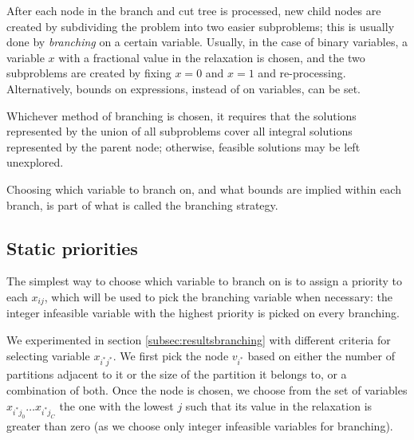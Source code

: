 After each node in the branch and cut tree is processed, new child nodes are created by subdividing the problem into two easier subproblems; this is usually done by \textit{branching} on a certain variable. Usually, in the case of binary variables, a variable $x$ with a fractional value in the relaxation is chosen, and the two subproblems are created by fixing $x = 0$ and $x = 1$ and re-processing. Alternatively, bounds on expressions, instead of on variables, can be set.

\begin{figure}[h]
	\label{fig:branching}
	\centering
\end{figure}

Whichever method of branching is chosen, it requires that the solutions represented by the union of all subproblems cover all integral solutions represented by the parent node; otherwise, feasible solutions may be left unexplored.

Choosing which variable to branch on, and what bounds are implied within each branch, is part of what is called the branching strategy. 

\subsection{Static priorities}

The simplest way to choose which variable to branch on is to assign a priority to each $x_{ij}$, which will be used to pick the branching variable when necessary: the integer infeasible variable with the highest priority is picked on every branching. 

We experimented in section \ref{subsec:resultsbranching} with different criteria for selecting variable $x_{i^*j^*}$. We first pick the node $v_{i^*}$ based on either the number of partitions adjacent to it or the size of the partition it belongs to, or a combination of both. Once the node is chosen, we choose from the set of variables $x_{i^*j_0} \ldots x_{i^*j_C}$ the one with the lowest $j$ such that its value in the relaxation is greater than zero (as we choose only integer infeasible variables for branching).

